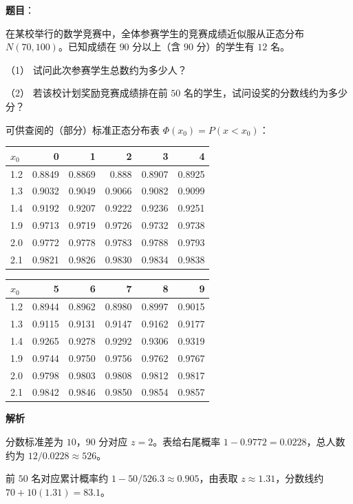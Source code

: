 \begin{answer}

\textbf{题目}：

在某校举行的数学竞赛中，全体参赛学生的竞赛成绩近似服从正态分布 $N(70,100)$。已知成绩在 $90$ 分以上（含 $90$ 分）的学生有 $12$ 名。

（1） 试问此次参赛学生总数约为多少人？

（2） 若该校计划奖励竞赛成绩排在前 $50$ 名的学生，试问设奖的分数线约为多少分？

可供查阅的（部分）标准正态分布表 $\Phi(x_0)=P(x<x_0)$：

\begin{center}
\begin{tabular}{lrrrrr}
\toprule
$x_0$ & 0 & 1 & 2 & 3 & 4 \\
\midrule
1.2 & 0.8849 & 0.8869 & 0.888 & 0.8907 & 0.8925 \\
1.3 & 0.9032 & 0.9049 & 0.9066 & 0.9082 & 0.9099 \\
1.4 & 0.9192 & 0.9207 & 0.9222 & 0.9236 & 0.9251 \\
1.9 & 0.9713 & 0.9719 & 0.9726 & 0.9732 & 0.9738 \\
2.0 & 0.9772 & 0.9778 & 0.9783 & 0.9788 & 0.9793 \\
2.1 & 0.9821 & 0.9826 & 0.9830 & 0.9834 & 0.9838 \\
\bottomrule
\end{tabular}
\end{center}

\begin{center}
\begin{tabular}{lrrrrr}
\toprule
$x_0$ & 5 & 6 & 7 & 8 & 9 \\
\midrule
1.2 & 0.8944 & 0.8962 & 0.8980 & 0.8997 & 0.9015 \\
1.3 & 0.9115 & 0.9131 & 0.9147 & 0.9162 & 0.9177 \\
1.4 & 0.9265 & 0.9278 & 0.9292 & 0.9306 & 0.9319 \\
1.9 & 0.9744 & 0.9750 & 0.9756 & 0.9762 & 0.9767 \\
2.0 & 0.9798 & 0.9803 & 0.9808 & 0.9812 & 0.9817 \\
2.1 & 0.9842 & 0.9846 & 0.9850 & 0.9854 & 0.9857 \\
\bottomrule
\end{tabular}
\end{center}

\textbf{解析}


分数标准差为 $10$，$90$ 分对应 $z=2$。表给右尾概率 $1-0.9772=0.0228$，总人数约为 $12/0.0228\approx526$。


前 $50$ 名对应累计概率约 $1-50/526.3\approx0.905$，由表取 $z\approx1.31$，分数线约 $70+10(1.31)=83.1$。



\end{answer}
